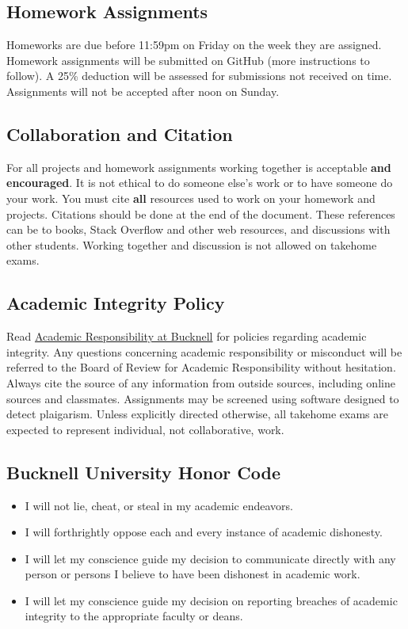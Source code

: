 \documentclass[11pt]{article} %
\begin{document}
  \subsection{Homework Assignments}
  
    Homeworks are due before 11:59pm on Friday on the week they are assigned.
    Homework assignments will be submitted on GitHub (more instructions to follow).
    A 25\% deduction will be assessed for submissions not received on time. Assignments will not be accepted after noon on Sunday.
  
  \subsection{Collaboration and Citation}
  
    For all projects and homework assignments working together is acceptable \textbf{and encouraged}. 
    It is not ethical to do someone else's work or to have someone do your work. 
    You must cite \textbf{all} resources used to work on your homework and projects. 
    Citations should be done at the end of the document. 
    These references can be to books, Stack Overflow and other web resources, and discussions with other students. 
    Working together and discussion is not allowed on takehome exams.
  
  \subsection{Academic Integrity Policy}
  
    Read \href{"https://www.bucknell.edu/academics/academic-responsibility-support/academic-responsibility"}{Academic Responsibility at Bucknell} for policies regarding academic integrity. Any questions concerning academic responsibility or misconduct will be referred to the Board of Review for Academic Responsibility without hesitation. Always cite the source of any information from outside sources, including online sources and classmates. Assignments may be screened using software designed to detect plaigarism. Unless explicitly directed otherwise, all takehome exams are expected to represent individual, not collaborative, work.
  
  \subsection{Bucknell University Honor Code}
  \begin{itemize}
  \item I will not lie, cheat, or steal in my academic endeavors.
  \item I will forthrightly oppose each and every instance of academic dishonesty.
  \item I will let my conscience guide my decision to communicate directly with any person or persons I believe to have been dishonest in academic work.
  \item I will let my conscience guide my decision on reporting breaches of academic integrity to the appropriate faculty or deans.
  \end{itemize}
\end{document}
